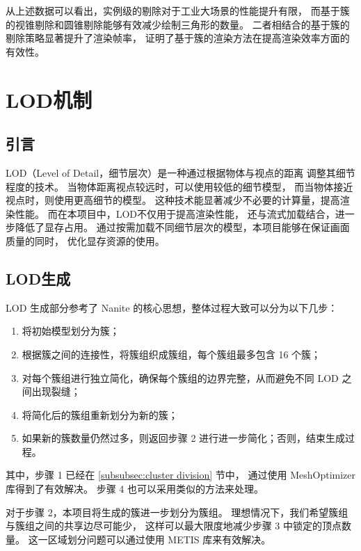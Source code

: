 从上述数据可以看出，实例级的剔除对于工业大场景的性能提升有限，
而基于簇的视锥剔除和圆锥剔除能够有效减少绘制三角形的数量。
二者相结合的基于簇的剔除策略显著提升了渲染帧率，
证明了基于簇的渲染方法在提高渲染效率方面的有效性。

\section{LOD机制}

\subsection{引言}

LOD（Level of Detail，细节层次）是一种通过根据物体与视点的距离
调整其细节程度的技术。
当物体距离视点较远时，可以使用较低的细节模型，
而当物体接近视点时，则使用更高细节的模型。
这种技术能显著减少不必要的计算量，提高渲染性能。
而在本项目中，LOD不仅用于提高渲染性能，
还与流式加载结合，进一步降低了显存占用。
通过按需加载不同细节层次的模型，本项目能够在保证画面质量的同时，
优化显存资源的使用。

\subsection{LOD生成} \label{subsec:LOD generation}

LOD 生成部分参考了 Nanite 的核心思想，整体过程大致可以分为以下几步：

\newcommand{\stepref}[1]{\textbf{Step~\ref{#1}}}

\begin{enumerate}
    \item 将初始模型划分为簇；
    \item 根据簇之间的连接性，将簇组织成簇组，每个簇组最多包含 16 个簇；
    \item 对每个簇组进行独立简化，确保每个簇组的边界完整，从而避免不同 LOD 之间出现裂缝；
    \item 将简化后的簇组重新划分为新的簇；
    \item 如果新的簇数量仍然过多，则返回步骤 2 进行进一步简化；否则，结束生成过程。
\end{enumerate}

其中，步骤 1 已经在 \ref{subsubsec:cluster division} 节中，
通过使用 MeshOptimizer 库得到了有效解决。
步骤 4 也可以采用类似的方法来处理。

对于步骤 2，本项目将生成的簇进一步划分为簇组。
理想情况下，我们希望簇组与簇组之间的共享边尽可能少，
这样可以最大限度地减少步骤 3 中锁定的顶点数量。
这一区域划分问题可以通过使用 METIS 库来有效解决。

